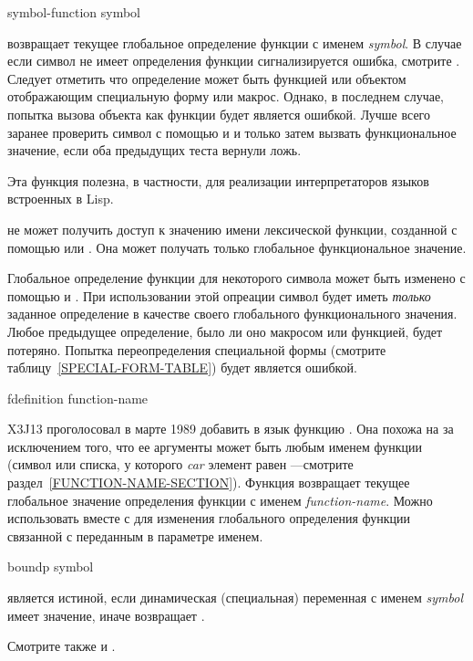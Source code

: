 \begin{defun}[Function]
symbol-function symbol

 возвращает текущее глобальное определение функции с именем
\emph{symbol}. В случае если символ не имеет определения функции сигнализируется
ошибка, смотрите . Следует отметить что определение может быть
функцией или объектом отображающим специальную форму или макрос.
Однако, в последнем случае, попытка вызова объекта как функции будет является
ошибкой.
Лучше всего заранее проверить символ с помощью  и
 и только затем вызвать функциональное значение, если оба
предыдущих теста вернули ложь.

Эта функция полезна, в частности, для реализации интерпретаторов языков
встроенных в Lisp.

 не может получить доступ к значению имени лексической
функции, созданной с помощью  или . Она может получать
только глобальное функциональное значение.

Глобальное определение функции для некоторого символа может быть изменено с
помощью  и .
При использовании этой опреации символ будет иметь \emph{только} заданное определение в качестве своего
глобального функционального значения. Любое предыдущее определение, было ли оно
макросом или функцией, будет потеряно.
Попытка переопределения специальной формы (смотрите
таблицу~\ref{SPECIAL-FORM-TABLE}) будет является ошибкой.
\end{defun}

\begin{newer}
\begin{defun}[Function]
fdefinition function-name

X3J13 проголосовал в марте 1989  добавить в язык функцию
.
Она похожа на  
за исключением того, что ее аргументы может быть любым именем функции (символ
или списка, у которого \emph{car} элемент равен ---смотрите раздел~\ref{FUNCTION-NAME-SECTION}).
Функция возвращает текущее глобальное значение определения функции с именем \emph{function-name}.
Можно использовать  вместе с 
для изменения глобального определения функции связанной с переданным в параметре
именем.
\end{defun}
\end{newer}

\begin{defun}[Function]
boundp symbol

 является истиной, если динамическая (специальная) переменная с
именем \emph{symbol} имеет значение, иначе возвращает {\false}.

Смотрите также  и .
\end{defun}

